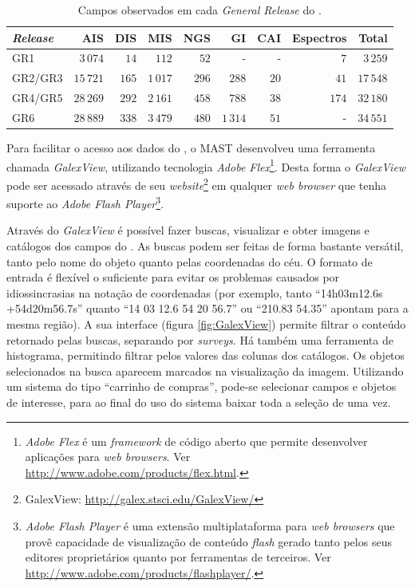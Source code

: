 \begin{table}
	\caption[Campos observados em cada {\em General Release} do \galex.]{Campos
	observados em cada {\em General Release} do \galex.}
	\begin{tabular}{l r r r r r r r r}
		{\em Release} & AIS       & DIS   & MIS      & NGS   &     GI   &  CAI & Espectros & Total     \\
		\midrule
		GR1           &  $3\,074$ &  $14$ &    $112$ &  $52$ &        - &    - &       $7$ &  $3\,259$ \\
		GR2/GR3       & $15\,721$ & $165$ & $1\,017$ & $296$ &    $288$ & $20$ &      $41$ & $17\,548$ \\
		GR4/GR5       & $28\,269$ & $292$ & $2\,161$ & $458$ &    $788$ & $38$ &     $174$ & $32\,180$ \\
		GR6           & $28\,889$ & $338$ & $3\,479$ & $480$ & $1\,314$ & $51$ &         - & $34\,551$ \\
	\end{tabular}
	\label{tab:GalexReleases}
\end{table}

Para facilitar o acesso aos dados do \galex, o MAST desenvolveu uma ferramenta
chamada {\em GalexView}, utilizando tecnologia {\em Adobe Flex}\footnote{{\em
Adobe Flex} é um {\em framework} de código aberto que permite desenvolver
aplicações para {\em web browsers}. Ver
\url{http://www.adobe.com/products/flex.html}.}. Desta forma o {\em GalexView }
pode ser acessado através de seu {\em website}\footnote{GalexView:
\url{http://galex.stsci.edu/GalexView/}} em qualquer {\em web browser} que tenha
suporte ao {\em Adobe Flash Player}\footnote{{\em Adobe Flash Player} é uma
extensão multiplataforma para {\em web browsers} que provê capacidade de
visualização de conteúdo {\em flash} gerado tanto pelos seus editores
proprietários quanto por ferramentas de terceiros. Ver
\url{http://www.adobe.com/products/flashplayer/}.}.

Através do {\em GalexView} é possível fazer buscas, visualizar e obter imagens e
catálogos dos campos do \galex. As buscas podem ser feitas de forma bastante
versátil, tanto pelo nome do objeto quanto pelas coordenadas do céu. O formato
de entrada é flexível o suficiente para evitar os problemas causados por
idiossincrasias na notação de coordenadas (por exemplo, tanto ``14h03m12.6s
+54d20m56.7s'' quanto ``14 03 12.6 54 20 56.7'' ou ``210.83 54.35'' apontam para
a mesma região). A sua interface (figura \ref{fig:GalexView}) permite filtrar o
conteúdo retornado pelas buscas, separando por {\em surveys}. Há também uma
ferramenta de histograma, permitindo filtrar pelos valores das colunas dos
catálogos. Os objetos selecionados na busca aparecem marcados na visualização da
imagem. Utilizando um sistema do tipo ``carrinho de compras'', pode-se
selecionar campos e objetos de interesse, para ao final do uso do sistema baixar
toda a seleção de uma vez.

